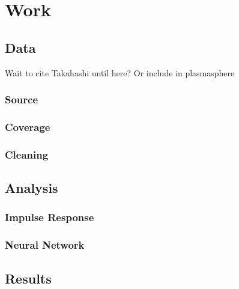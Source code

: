 \chapter[Work]{Work}

\section{Data}
\vnote Wait to cite Takahashi until here? Or include in plasmasphere 

\subsection{Source}
\subsection{Coverage}
\subsection{Cleaning}

\section{Analysis}
\subsection{Impulse Response}
\subsection{Neural Network}

\section{Results}